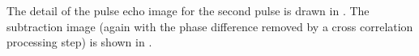 

The detail of the pulse echo image for the second pulse is drawn in .
The subtraction image (again with the phase difference removed by a cross correlation processing step)
is shown in .


